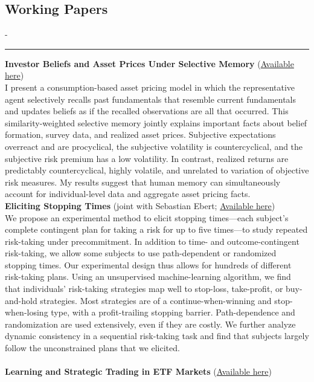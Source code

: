 \documentclass{res}
\newcommand{\sectionline}{	\vspace{-8pt}
	{\parindent-\sectionwidth \rule{\resumewidth}{0.4pt}} }
\begin{document}
\begin{resume}
\section{Working Papers} 	
	\sectionline
    \textbf{Investor Beliefs and Asset Prices Under Selective Memory} (\href{http://maxvoigt.github.io/files/Voigt_JMP_BeliefsAssetPrices.pdf}{Available here}) \\
	I present a consumption-based asset pricing model in which the representative agent selectively recalls past fundamentals that resemble current fundamentals and updates beliefs as if the recalled observations are all that occurred. This similarity-weighted selective memory jointly explains important facts about belief formation, survey data, and realized asset prices. Subjective expectations overreact and are procyclical, the subjective volatility is countercyclical, and the subjective risk premium has a low volatility. In contrast, realized returns are predictably countercyclical, highly volatile, and unrelated to variation of objective risk measures. My results suggest that human memory can simultaneously account for individual-level data and aggregate asset pricing facts.
	\medskip
	\\
    \textbf{Eliciting Stopping Times} (joint with Sebastian Ebert; \href{https://papers.ssrn.com/sol3/papers.cfm?abstract_id=4526931}{Available here})\\
    We propose an experimental method to elicit stopping times—each subject’s complete contingent plan for taking a risk for up to five times—to study repeated risk-taking under precommitment. In addition to time- and outcome-contingent risk-taking, we allow some subjects to use path-dependent or randomized stopping times. Our experimental design thus allows for hundreds of different risk-taking plans. Using an unsupervised machine-learning algorithm, we find that individuals’ risk-taking strategies map well to stop-loss, take-profit, or buy-and-hold strategies. Most strategies are of a continue-when-winning and stop-when-losing type, with a profit-trailing stopping barrier. Path-dependence and randomization are used extensively, even if they are costly. We further analyze dynamic consistency in a sequential risk-taking task and find that subjects largely follow the unconstrained plans that we elicited. 
	\medskip
    \\ \\
    \textbf{Learning and Strategic Trading in ETF Markets} (\href{http://maxvoigt.github.io/files/Voigt2023_ETFMarkets.pdf}{Available here}) \\

\end{resume}
\end{document}

